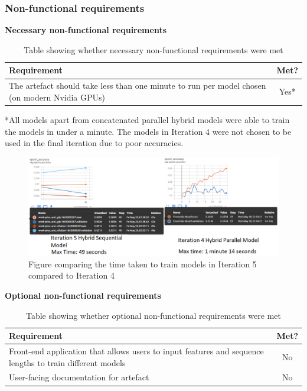 \subsubsection{Non-functional requirements}
\textbf{Necessary non-functional requirements}
\begin{table}[ht]
    \centering
    \begin{tabular}{|p{100mm}|c|}
        \hline
        Requirement & Met? \\
        \hline\hline
        The artefact should take less than one minute to run per model chosen (on modern Nvidia GPUs) & Yes* \\
        \hline
    \end{tabular}
    \caption{Table showing whether necessary non-functional requirements were met}
    \label{tab:necessary_non_functional_requirements}
\end{table}

*All models apart from concatenated parallel hybrid models were able to train the models in under a minute.
The models in Iteration 4 were not chosen to be used in the final iteration due to poor accuracies.
\begin{figure}[ht]
    \centering
    \includegraphics[width=0.95\columnwidth]{figures/time_taken.png}
    \caption[Time taken to train models]{Figure comparing the time taken to train models in Iteration 5 compared to Iteration 4}
    \label{fig:time_take_for_models}
\end{figure}
\FloatBarrier

\textbf{Optional non-functional requirements}
\begin{table}[ht]
    \centering
    \begin{tabular}{|p{100mm}|c|}
        \hline
        Requirement & Met? \\
        \hline\hline
        Front-end application that allows users to input features and sequence lengths to train different models & No \\
        User-facing documentation for artefact & No \\
        \hline
    \end{tabular}
    \caption{Table showing whether optional non-functional requirements were met}
    \label{tab:optional_non_functional_requirements}
\end{table}

